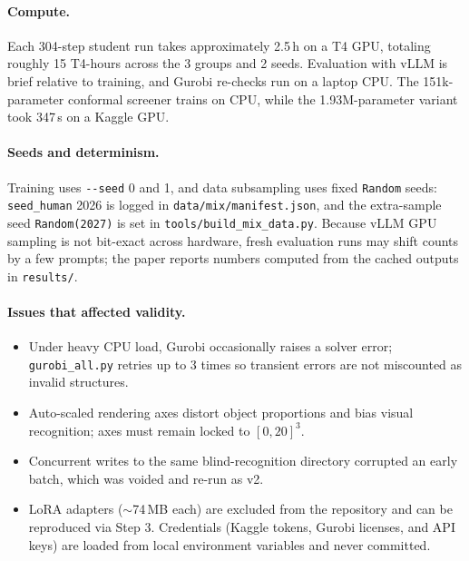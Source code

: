 \documentclass{article}
\begin{document}
\paragraph{Compute.} Each 304-step student run takes approximately 2.5\,h on a T4 GPU, totaling roughly 15 T4-hours across the 3 groups and 2 seeds. Evaluation with vLLM is brief relative to training, and Gurobi re-checks run on a laptop CPU. The 151k-parameter conformal screener trains on CPU, while the 1.93M-parameter variant took 347\,s on a Kaggle GPU.

\paragraph{Seeds and determinism.} Training uses \texttt{-{}-seed} 0 and 1, and data subsampling uses fixed \texttt{Random} seeds: \texttt{seed\_human} 2026 is logged in \texttt{data/mix/manifest.json}, and the extra-sample seed \texttt{Random(2027)} is set in \texttt{tools/build\_mix\_data.py}. Because vLLM GPU sampling is not bit-exact across hardware, fresh evaluation runs may shift counts by a few prompts; the paper reports numbers computed from the cached outputs in \texttt{results/}.

\paragraph{Issues that affected validity.}
\begin{itemize}\itemsep0pt
\item Under heavy CPU load, Gurobi occasionally raises a solver error; \texttt{gurobi\_all.py} retries up to 3 times so transient errors are not miscounted as invalid structures.
\item Auto-scaled rendering axes distort object proportions and bias visual recognition; axes must remain locked to $[0,20]^3$.
\item Concurrent writes to the same blind-recognition directory corrupted an early batch, which was voided and re-run as v2.
\item LoRA adapters ($\sim$74\,MB each) are excluded from the repository and can be reproduced via Step 3. Credentials (Kaggle tokens, Gurobi licenses, and API keys) are loaded from local environment variables and never committed.
\end{itemize}

\end{document}
